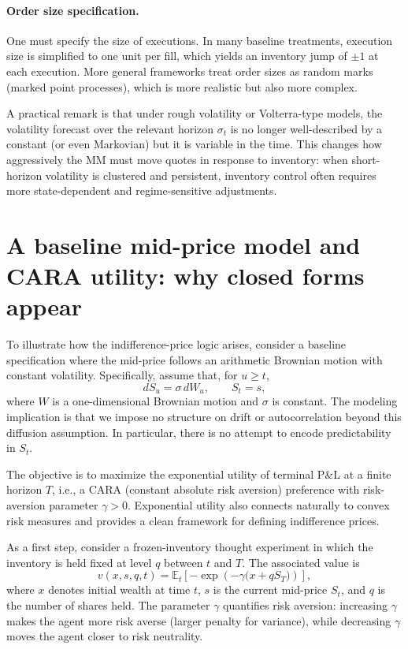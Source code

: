 \documentclass[a4paper,10pt,titlepage,oneside,openany]{book}
\theoremstyle{plain}\newtheorem{theorem}{Theorem}[chapter]
\theoremstyle{definition}\newtheorem{definition}{Definition}[chapter]
\theoremstyle{remark}\newtheorem{remark}{Remark}[chapter]
\begin{document}
\paragraph{Order size specification.}
One must specify the size of executions. In many baseline treatments, execution size is simplified to one unit per fill, which yields an inventory jump of $\pm 1$ at each execution. More general frameworks treat order sizes as random marks (marked point processes), which is more realistic but also more complex.

A practical remark is that under rough volatility or Volterra-type models, the volatility forecast over the relevant horizon $\sigma_t$ is no longer well-described by a constant (or even Markovian) but it is variable in the time. This changes how aggressively the MM must move quotes in response to inventory: when short-horizon volatility is clustered and persistent, inventory control often requires more state-dependent and regime-sensitive adjustments.

\section{A baseline mid-price model and CARA utility: why closed forms appear}
To illustrate how the indifference-price logic arises, consider a baseline specification where the mid-price follows an arithmetic Brownian motion with constant volatility. Specifically, assume that, for $u\ge t$,
\[
dS_u = \sigma\, dW_u,
\qquad S_t=s,
\]
where $W$ is a one-dimensional Brownian motion and $\sigma$ is constant. The modeling implication is that we impose no structure on drift or autocorrelation beyond this diffusion assumption. In particular, there is no attempt to encode predictability in $S_t$.

The objective is to maximize the exponential utility of terminal P\&L at a finite horizon $T$, i.e., a CARA (constant absolute risk aversion) preference with risk-aversion parameter $\gamma>0$. Exponential utility also connects naturally to convex risk measures and provides a clean framework for defining indifference prices.

As a first step, consider a frozen-inventory thought experiment in which the inventory is held fixed at level $q$ between $t$ and $T$. The associated value is
\[
v(x,s,q,t)
=
\mathbb{E}_t\!\left[-\exp\!\left(-\gamma\bigl(x+qS_T\bigr)\right)\right],
\]
where $x$ denotes initial wealth at time $t$, $s$ is the current mid-price $S_t$, and $q$ is the number of shares held. The parameter $\gamma$ quantifies risk aversion: increasing $\gamma$ makes the agent more risk averse (larger penalty for variance), while decreasing $\gamma$ moves the agent closer to risk neutrality.
\end{document}
